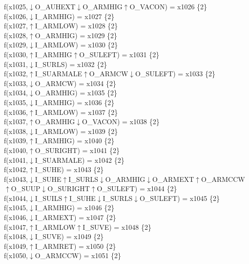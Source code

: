 f(x1025,$\downarrow$O\_AUHEXT$\downarrow$O\_ARMHIG$\uparrow$O\_VACON) = x1026 \{2\} \\  
f(x1026,$\downarrow$I\_ARMHIG) = x1027 \{2\} \\  
f(x1027,$\uparrow$I\_ARMLOW) = x1028 \{2\} \\  
f(x1028,$\uparrow$O\_ARMHIG) = x1029 \{2\} \\  
f(x1029,$\downarrow$I\_ARMLOW) = x1030 \{2\} \\  
f(x1030,$\uparrow$I\_ARMHIG$\uparrow$O\_SULEFT) = x1031 \{2\} \\  
f(x1031,$\downarrow$I\_SURLS) = x1032 \{2\} \\  
f(x1032,$\uparrow$I\_SUARMALE$\uparrow$O\_ARMCW$\downarrow$O\_SULEFT) = x1033 \{2\} \\  
f(x1033,$\downarrow$O\_ARMCW) = x1034 \{2\} \\  
f(x1034,$\downarrow$O\_ARMHIG) = x1035 \{2\} \\  
f(x1035,$\downarrow$I\_ARMHIG) = x1036 \{2\} \\  
f(x1036,$\uparrow$I\_ARMLOW) = x1037 \{2\} \\  
f(x1037,$\uparrow$O\_ARMHIG$\downarrow$O\_VACON) = x1038 \{2\} \\  
f(x1038,$\downarrow$I\_ARMLOW) = x1039 \{2\} \\  
f(x1039,$\uparrow$I\_ARMHIG) = x1040 \{2\} \\  
f(x1040,$\uparrow$O\_SURIGHT) = x1041 \{2\} \\  
f(x1041,$\downarrow$I\_SUARMALE) = x1042 \{2\} \\  
f(x1042,$\uparrow$I\_SUHE) = x1043 \{2\} \\  
f(x1043,$\downarrow$I\_SUHE$\uparrow$I\_SURLS$\downarrow$O\_ARMHIG$\downarrow$O\_ARMEXT$\uparrow$O\_ARMCCW$\uparrow$O\_SUUP$\downarrow$O\_SURIGHT$\uparrow$O\_SULEFT) = x1044 \{2\} \\  
f(x1044,$\downarrow$I\_SUILS$\uparrow$I\_SUHE$\downarrow$I\_SURLS$\downarrow$O\_SULEFT) = x1045 \{2\} \\  
f(x1045,$\downarrow$I\_ARMHIG) = x1046 \{2\} \\  
f(x1046,$\downarrow$I\_ARMEXT) = x1047 \{2\} \\  
f(x1047,$\uparrow$I\_ARMLOW$\uparrow$I\_SUVE) = x1048 \{2\} \\  
f(x1048,$\downarrow$I\_SUVE) = x1049 \{2\} \\  
f(x1049,$\uparrow$I\_ARMRET) = x1050 \{2\} \\  
f(x1050,$\downarrow$O\_ARMCCW) = x1051 \{2\} \\  
